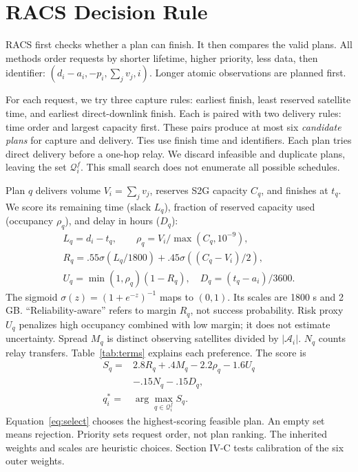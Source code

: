 \documentclass[conference]{IEEEtran}
\newcommand{\sig}{\sigma}
\begin{document}
\section{RACS Decision Rule}
RACS first checks whether a plan can finish. It then compares the valid plans. All methods order requests by shorter lifetime, higher priority, less data, then identifier: $(d_i-a_i,-p_i,\sum_jv_j,i)$. Longer atomic observations are planned first.

For each request, we try three capture rules: earliest finish, least reserved satellite time, and earliest direct-downlink finish. Each is paired with two delivery rules: time order and largest capacity first. These pairs produce at most six \emph{candidate plans} for capture and delivery. Ties use finish time and identifiers. Each plan tries direct delivery before a one-hop relay. We discard infeasible and duplicate plans, leaving the set $\mathcal Q_i^f$. This small search does not enumerate all possible schedules.

Plan $q$ delivers volume $V_i=\sum_jv_j$, reserves S2G capacity $C_q$, and finishes at $t_q$. We score its remaining time (slack $L_q$), fraction of reserved capacity used (occupancy $\rho_q$), and delay in hours ($D_q$):
\begin{gather}
L_q=d_i-t_q, \qquad \rho_q=V_i/\max(C_q,10^{-9}),\\
R_q=.55\sig(L_q/1800)+.45\sig((C_q-V_i)/2),\label{eq:margin}\\
U_q=\min(1,\rho_q)(1-R_q),\quad D_q=(t_q-a_i)/3600.
\end{gather}
The sigmoid $\sig(z)=(1+e^{-z})^{-1}$ maps to $(0,1)$. Its scales are 1800 s and 2 GB. ``Reliability-aware'' refers to margin $R_q$, not success probability. Risk proxy $U_q$ penalizes high occupancy combined with low margin; it does not estimate uncertainty. Spread $M_q$ is distinct observing satellites divided by $|\mathcal A_i|$. $N_q$ counts relay transfers. Table~\ref{tab:terms} explains each preference. The score is
\begin{align}
S_q={}&2.8R_q+.4M_q-2.2\rho_q-1.6U_q\nonumber\\
      &-.15N_q-.15D_q,\label{eq:score}\\
q_i^*={}&\arg\max_{q\in\mathcal Q_i^f}S_q.\label{eq:select}
\end{align}
Equation~\eqref{eq:select} chooses the highest-scoring feasible plan. An empty set means rejection. Priority sets request order, not plan ranking. The inherited weights and scales are heuristic choices. Section IV-C tests calibration of the six outer weights.
\end{document}
